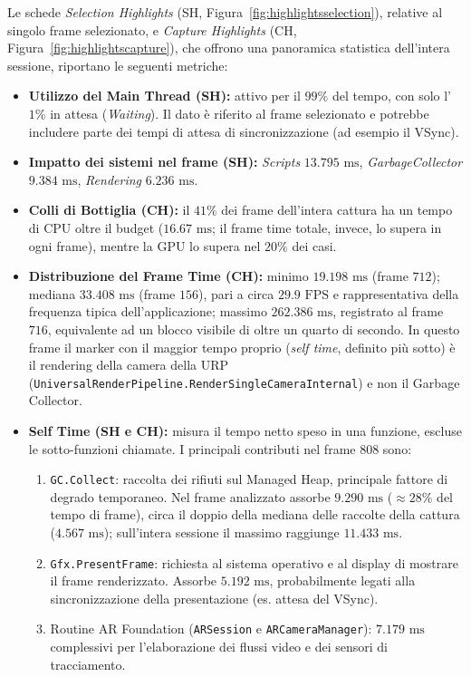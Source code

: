 Le schede \textit{Selection Highlights} (SH, Figura~\ref{fig:highlightsselection}), relative al singolo frame selezionato, e \textit{Capture Highlights} (CH, Figura~\ref{fig:highlightscapture}), che offrono una panoramica statistica dell'intera sessione, riportano le seguenti metriche:

\begin{itemize}
\item \textbf{Utilizzo del Main Thread (SH):} attivo per il $99\%$ del tempo, con solo l'$1\%$ in attesa (\textit{Waiting}). Il dato è riferito al frame selezionato e potrebbe includere parte dei tempi di attesa di sincronizzazione (ad esempio il VSync).

\item \textbf{Impatto dei sistemi nel frame (SH):} \textit{Scripts} $13.795\text{ ms}$, \textit{GarbageCollector} $9.384\text{ ms}$, \textit{Rendering} $6.236\text{ ms}$.

\item \textbf{Colli di Bottiglia (CH):} il $41\%$ dei frame dell'intera cattura ha un tempo di CPU oltre il budget ($16.67\text{ ms}$; il frame time totale, invece, lo supera in ogni frame), mentre la GPU lo supera nel $20\%$ dei casi.

\item \textbf{Distribuzione del Frame Time (CH):} minimo $19.198\text{ ms}$ (frame $712$); mediana $33.408\text{ ms}$ (frame $156$), pari a circa $29.9\text{ FPS}$ e rappresentativa della frequenza tipica dell'applicazione; massimo $262.386\text{ ms}$, registrato al frame $716$, equivalente ad un blocco visibile di oltre un quarto di secondo. In questo frame il marker con il maggior tempo proprio (\textit{self time}, definito più sotto) è il rendering della camera della URP (\texttt{UniversalRender\allowbreak Pipeline.\allowbreak RenderSingle\allowbreak Camera\allowbreak Internal}) e non il Garbage Collector.

\item \textbf{Self Time (SH e CH):} misura il tempo netto speso in una funzione, escluse le sotto-funzioni chiamate. I principali contributi nel frame $808$ sono:
\begin{enumerate}
    \item \texttt{GC.Collect}: raccolta dei rifiuti sul Managed Heap, principale fattore di degrado temporaneo. Nel frame analizzato assorbe $9.290\text{ ms}$ ($\approx 28\%$ del tempo di frame), circa il doppio della mediana delle raccolte della cattura ($4.567\text{ ms}$); sull'intera sessione il massimo raggiunge $11.433\text{ ms}$.
    \item \texttt{Gfx.PresentFrame}: richiesta al sistema operativo e al display di mostrare il frame renderizzato. Assorbe $5.192\text{ ms}$, probabilmente legati alla sincronizzazione della presentazione (es. attesa del VSync).
    \item Routine AR Foundation (\texttt{ARSession} e \texttt{ARCameraManager}): $7.179\text{ ms}$ complessivi per l'elaborazione dei flussi video e dei sensori di tracciamento.
\end{enumerate}


\end{itemize}
